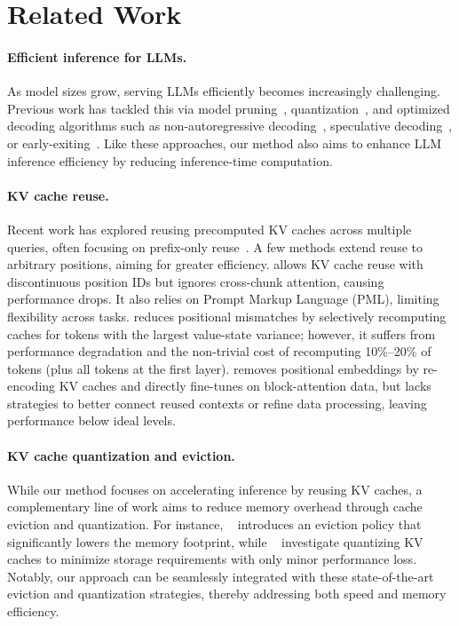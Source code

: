 \section{Related Work}
\paragraph{Efficient inference for LLMs.}
As model sizes grow, serving LLMs efficiently becomes increasingly challenging. Previous work has tackled this via model pruning~\citep{men2024shortgpt,sreenivas2024llm, xiasheared, hou2025instruction}, quantization~\citep{lin2024awq,van2024gptvq,frantar2022gptq,xiao2023smoothquant,yao2022zeroquant,dettmers2022gpt3}, and optimized decoding algorithms such as non-autoregressive decoding~\citep{santilli2023accelerating}, speculative decoding~\citep{kim2024speculative,elhoushi2024layer,miao2023specinfer}, or early-exiting~\citep{he2021magic,kong2022accelerating}. Like these approaches, our method also aims to enhance LLM inference efficiency by reducing inference-time computation.  

\paragraph{KV cache reuse.}
Recent work has explored reusing precomputed KV caches across multiple queries, often focusing on prefix-only reuse~\citep{jin2024ragcache,liu2024optimizing,zheng2023efficiently}. A few methods extend reuse to arbitrary positions, aiming for greater efficiency. {\promptcache}\citep{gim2024prompt} allows KV cache reuse with discontinuous position IDs but ignores cross-chunk attention, causing performance drops. It also relies on Prompt Markup Language (PML), limiting flexibility across tasks. {\cacheblend} reduces positional mismatches by selectively recomputing caches for tokens with the largest value-state variance; however, it suffers from performance degradation and the non-trivial cost of recomputing 10\%--20\% of tokens (plus all tokens at the first layer). {\blockattn}\citep{sun2024block} removes positional embeddings by re-encoding KV caches and directly fine-tunes on block-attention data, but lacks strategies to better connect reused contexts or refine data processing, leaving performance below ideal levels.

\paragraph{KV cache quantization and eviction.}
While our method focuses on accelerating inference by reusing KV caches, a complementary line of work aims to reduce memory overhead through cache eviction and quantization. For instance, ~\citep{zhang2024h2o,oren2024transformers,xiao2023efficient,ge2023model} introduces an eviction policy that significantly lowers the memory footprint, while ~\citep{liu2024kivi,xiao2023smoothquant,lin2024awq,frantar2022gptq,kim2023squeezellm,zhao2024atom,sheng2023flexgen} investigate quantizing KV caches to minimize storage requirements with only minor performance loss. Notably, our approach can be seamlessly integrated with these state-of-the-art eviction and quantization strategies, thereby addressing both speed and memory efficiency.